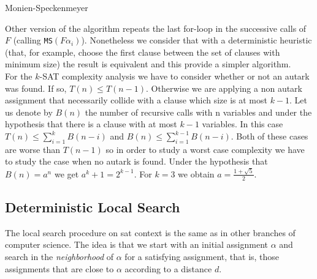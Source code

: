 \begin{algorithm}
  \caption{Monien-Speckenmeyer}\label{MS}
  \begin{algorithmic}[1]
     
    \EndIf
     
    \EndIf
    \State
     \Return $MS(F\{p\to 1\})$
    \EndIf
     \Return $MS(F\{l\to 1\}})$
  \EndIf
  \State Choose the shortest clause $C = \{u_1,...,u_m\}$
  \For{$i \in \{1,...,m\}$ }
  \State $\alpha_1 := \{u_1\to 0,...,u_{i-1}\to 0,u_i\to 1\}$
  \If{$\alpha_i$ is autark } \Return \texttt{MS}$(F\alpha_i)$
  \EndIf
  \EndFor
  \If{\texttt{MS}$(F\{u_1=1\})$} \Return 1
  \EndIf
  \State \Return $MS(F\{u_1=0\})$
\end{algorithmic}
\end{algorithm}


Other version of the algorithm repeats the last for-loop  in the successive calls of $F$ (calling \texttt{MS}$(F\alpha_i)$). Nonetheless we consider that with a deterministic heuristic (that, for example, choose the first clause between the set of clauses with minimum size) the result is equivalent and this provide a simpler algorithm.\\

For the $k$-SAT complexity analysis we have to consider whether or not an autark was found. If so, $T(n) \le T(n-1)$. Otherwise we are applying a non autark assignment that necessarily collide with a clause which size is at most $k-1$. Let us denote by $B(n)$ the number of recursive calls with n variables and under the hypothesis that there is a clause with at most $k-1$ variables. In this case $T(n) \le \sum_{i=1}^{k}B(n-i)$ and $B(n) \le \sum_{i=1}^{k-1}B(n-i)$. Both of these cases are worse than $T(n-1)$ so in order to study a worst case complexity we have to study the case when no autark is found. Under the hypothesis that $B(n) = a^n$ we get $a^k+1=2^{k-1}$. For $k=3$ we obtain $a=\frac{1 + \sqrt{5}}{2}$.



\subsection{Deterministic Local Search}

The local search procedure on sat context is the same as in other branches of computer science. The idea is that we start with an initial assignment $\alpha$ and search in the \emph{neighborhood} of $\alpha$ for a satisfying assignment, that is, those assignments that are close to $\alpha$ according to a distance $d$. 

